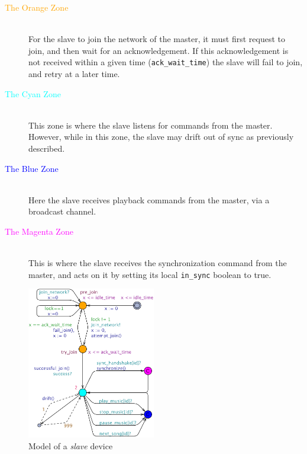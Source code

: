 \begin{description}
    \item[\textcolor{orange}{The Orange Zone}] \hfill\\
        For the slave to join the network of the master, it must first request to join, and then wait for an acknowledgement.
        If this acknowledgement is not received within a given time (\texttt{ack\_wait\_time}) the slave will fail to join, and retry at a later time.
    \item[\textcolor{cyan}{The Cyan Zone}] \hfill\\
        This zone is where the slave listens for commands from the master.
        However, while in this zone, the slave may drift out of sync as previously described.
    \item[\textcolor{blue}{The Blue Zone}] \hfill\\
        Here the slave receives playback commands from the master, via a broadcast channel.
    \item[\textcolor{magenta}{The Magenta Zone}] \hfill\\
        This is where the slave receives the synchronization command from the master, and acts on it by setting its local \texttt{in\_sync} boolean to true.
\end{description}

\begin{figure}[htb]
    \centering
    \includegraphics[width=0.5\textwidth]{slave_model.pdf}
    \caption{Model of a \textit{slave} device}\label{fig:slave_model}
\end{figure}

